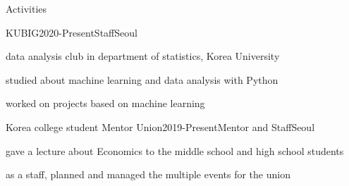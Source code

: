 \documentclass{resume} %
\begin{document}
\begin{rSection}{Activities}
\begin{rSubsection}{KUBIG}{2020-Present}{Staff}{Seoul}
\item data analysis club in department of statistics, Korea University
\item studied about machine learning and data analysis with Python
\item worked on projects based on machine learning

\end{rSubsection}
\begin{rSubsection}{Korea college student Mentor Union}{2019-Present}{Mentor and Staff}{Seoul}
\item gave a lecture about Economics to the middle school and high school students
\item as a staff, planned and managed the multiple events for the union

\end{rSubsection}
\end{rSection}
\end{document}
